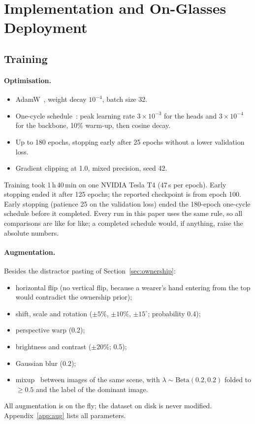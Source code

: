 \section{Implementation and On-Glasses Deployment}\label{sec:impl}

\subsection{Training}
\paragraph{Optimisation.}
\begin{itemize}
\item AdamW~\cite{loshchilov2019decoupled}, weight decay $10^{-4}$, batch size 32.
\item One-cycle schedule~\cite{smith2019super}: peak learning rate $3\times10^{-3}$ for the heads and $3\times10^{-4}$ for the backbone, 10\% warm-up, then cosine decay.
\item Up to 180 epochs, stopping early after 25 epochs without a lower validation loss.
\item Gradient clipping at 1.0, mixed precision, seed 42.
\end{itemize}
Training took 1\,h\,40\,min on one NVIDIA Tesla T4 (47\,s per epoch). Early stopping ended it after 125 epochs; the reported checkpoint is from epoch 100. Early stopping (patience 25 on the validation loss) ended the 180-epoch one-cycle schedule before it completed. Every run in this paper uses the same rule, so all comparisons are like for like; a completed schedule would, if anything, raise the absolute numbers.

\paragraph{Augmentation.} Besides the distractor pasting of Section~\ref{sec:ownership}:
\begin{itemize}
\item horizontal flip (no vertical flip, because a wearer's hand entering from the top would contradict the ownership prior);
\item shift, scale and rotation (${\pm}5\%$, ${\pm}10\%$, ${\pm}15^\circ$; probability 0.4);
\item perspective warp (0.2);
\item brightness and contrast (${\pm}20\%$; 0.5);
\item Gaussian blur (0.2);
\item mixup~\cite{zhang2018mixup} between images of the same scene, with $\lambda\sim\mathrm{Beta}(0.2,0.2)$ folded to $\geq0.5$ and the label of the dominant image.
\end{itemize}
All augmentation is on the fly; the dataset on disk is never modified. Appendix~\ref{app:aug} lists all parameters.

